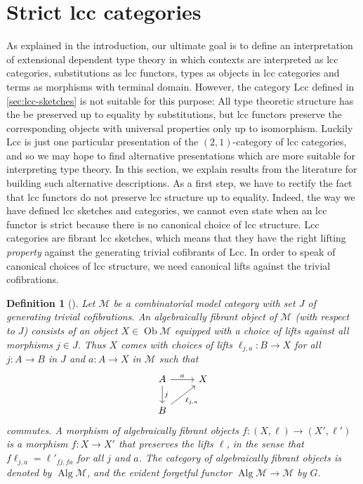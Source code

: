 \documentclass{article}
\newtheorem{definition}{Definition}
\begin{document}
\section{Strict lcc categories}
\label{sec:strict-lcc-categories}

As explained in the introduction, our ultimate goal is to define an interpretation of extensional dependent type theory in which contexts are interpreted as lcc categories, substitutions as lcc functors, types as objects in lcc categories and terms as morphisms with terminal domain.
However, the category $\mathrm{Lcc}$ defined in \ref{sec:lcc-sketches} is not suitable for this purpose:
All type theoretic structure has the be preserved up to equality by substitutions, but lcc functors preserve the corresponding objects with universal properties only up to isomorphism.
Luckily $\mathrm{Lcc}$ is just one particular presentation of the $(2, 1)$-category of lcc categories, and so we may hope to find alternative presentations which are more suitable for interpreting type theory.
In this section, we explain results from the literature for building such alternative descriptions.
As a first step, we have to rectify the fact that lcc functors do not preserve lcc structure up to equality.
Indeed, the way we have defined lcc sketches and categories, we cannot even state when an lcc functor is strict because there is no canonical choice of lcc structure.
Lcc categories are fibrant lcc sketches, which means that they have the right lifting \emph{property} against the generating trivial cofibrants of $\mathrm{Lcc}$.
In order to speak of canonical choices of lcc structure, we need canonical lifts against the trivial cofibrations.

\begin{definition}[\cite{algebraic-models}]
  Let $\mathcal{M}$ be a combinatorial model category with set $J$ of generating trivial cofibrations.
  An \emph{algebraically fibrant object} of $\mathcal{M}$ (with respect to $J$) consists of an object $X \in \operatorname{Ob} \mathcal{M}$ equipped with a choice of lifts against all morphisms $j \in J$.
  Thus $X$ comes with choices of lifts $\ell_{j, a} : B \rightarrow X$ for all $j : A \rightarrow B$ in $J$ and $a : A \rightarrow X$ in $\mathcal{M}$ such that
  \begin{equation}
    \begin{tikzcd}
      A \arrow[d, "j"] \arrow[r, "a"] & X \\
      B \arrow[ur, "{\ell_{j, a}}"']
    \end{tikzcd}
  \end{equation}
  commutes.
  A morphism of algebraically fibrant objects $f : (X, \ell) \rightarrow (X', \ell')$ is a morphism $f : X \rightarrow X'$ that preserves the lifts $\ell$, in the sense that $f\ell_{j, a} = \ell'_{fj, fa}$ for all $j$ and $a$.
  The category of algebraically fibrant objects is denoted by $\operatorname{Alg} \mathcal{M}$, and the evident forgetful functor $\operatorname{Alg} \mathcal{M} \rightarrow \mathcal{M}$ by $G$.
\end{definition}
\end{document}
